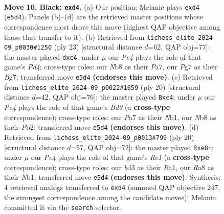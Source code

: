 \documentclass[11pt]{article}
\begin{document}
\clearpage

\begin{figure}[p]\centering
\begin{subfigure}{0.46\textwidth}\centering
\resizebox{\linewidth}{!}{%
\newchessgame
\chessboard[
  setfen={rnbqr1k1/pp3ppp/3b1n2/3pp1B1/3P4/3B1N2/PPP2PPP/RN1Q1RK1 b - - 1 10},
  showmover=false,
  pgfstyle=straightmove, color=movearrow, markmove={e5-d4}
]}
\caption{}
\end{subfigure}\hfill
\begin{subfigure}{0.46\textwidth}\centering
\resizebox{\linewidth}{!}{%
\newchessgame
\chessboard[
  setfen={r1bqr1k1/ppp2pbp/5np1/3p2B1/2P5/3BPN2/PP3PPP/R2Q1RK1 b - - 0 12},
  showmover=false,
  pgfstyle=straightmove, color=movearrow, markmove={d5-c4}
]}
\caption{}
\end{subfigure}
\\[4pt]
\begin{subfigure}{0.46\textwidth}\centering
\resizebox{\linewidth}{!}{%
\newchessgame
\chessboard[
  setfen={rn1q1rk1/ppp2ppp/3b1n2/8/2pP2b1/3BBN2/PP2QPPP/RN2R1K1 w - - 0 11},
  showmover=false,
  pgfstyle=straightmove, color=movearrow, markmove={d3-c4}
]}
\caption{}
\end{subfigure}\hfill
\begin{subfigure}{0.46\textwidth}\centering
\resizebox{\linewidth}{!}{%
\newchessgame
\chessboard[
  setfen={rn1qr1k1/ppp2ppp/3b1n2/3P4/3P2b1/3B1N2/PP3PPP/RNBQR1K1 w - - 1 11},
  showmover=false,
  pgfstyle=straightmove, color=movearrow, markmove={e1-e8}
]}
\caption{}
\end{subfigure}
\caption{\textbf{Move 10, Black: \texttt{exd4}.} (a) Our position; Melanie plays \texttt{exd4} (\texttt{e5d4}). Panels (b)--(d) are the retrieved master positions whose correspondence most drove this move (highest QAP objective among those that transfer to it). (b) Retrieved from \texttt{lichess\_elite\_2024-09\_p0030\#1250} (ply 23) [structural distance $d$=62, QAP obj=77]: the master played \texttt{dxc4}; under $\mu$ our \emph{Pe4} plays the role of that game's \emph{Pd4}; cross-type roles: our \emph{N}b8 as their \emph{P}a7, our \emph{P}g7 as their \emph{B}g7; transferred move \texttt{e5d4} \textbf{(endorses this move)}. (c) Retrieved from \texttt{lichess\_elite\_2024-09\_p0022\#1659} (ply 20) [structural distance $d$=42, QAP obj=76]: the master played \texttt{Bxc4}; under $\mu$ our \emph{Pe4} plays the role of that game's \emph{Bd3} (a \textbf{cross-type} correspondence); cross-type roles: our \emph{P}a7 as their \emph{N}b1, our \emph{N}b8 as their \emph{P}b2; transferred move \texttt{e5d4} \textbf{(endorses this move)}. (d) Retrieved from \texttt{lichess\_elite\_2024-09\_p0013\#799} (ply 20) [structural distance $d$=57, QAP obj=72]: the master played \texttt{Rxe8+}; under $\mu$ our \emph{Pe4} plays the role of that game's \emph{Re1} (a \textbf{cross-type} correspondence); cross-type roles: our \emph{b}d3 as their \emph{R}a1, our \emph{R}a8 as their \emph{N}b1; transferred move \texttt{e5d4} \textbf{(endorses this move)}. Synthesis: 4 retrieved analogs transferred to \texttt{exd4} (summed QAP objective 247, the strongest correspondence among the candidate moves); Melanie committed it via the \texttt{search} selector.}

\end{figure}
\end{document}
